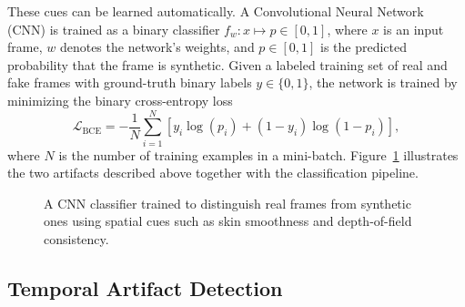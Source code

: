 \documentclass[a4paper,12pt]{article}
\begin{document}
These cues can be learned automatically. A Convolutional Neural Network (CNN) is trained as a binary classifier $f_w : x \mapsto p \in [0,1]$, where $x$ is an input frame, $w$ denotes the network's weights, and $p \in [0,1]$ is the predicted probability that the frame is synthetic. Given a labeled training set of real and fake frames with ground-truth binary labels $y \in \{0, 1\}$, the network is trained by minimizing the binary cross-entropy loss
\begin{equation}
    \mathcal{L}_{\text{BCE}} = -\frac{1}{N} \sum_{i=1}^{N} \left[ y_i \log(p_i) + (1 - y_i) \log(1 - p_i) \right],
    \label{eq:bce-loss}
\end{equation}
where $N$ is the number of training examples in a mini-batch. Figure~\ref{fig:spatial} illustrates the two artifacts described above together with the classification pipeline.

\begin{figure}[H]
    \centering
    \caption{A CNN classifier trained to distinguish real frames from synthetic ones using spatial cues such as skin smoothness and depth-of-field consistency.}
    \label{fig:spatial}
\end{figure}

\subsection{Temporal Artifact Detection}
\label{subsec:temporal}
\end{document}
